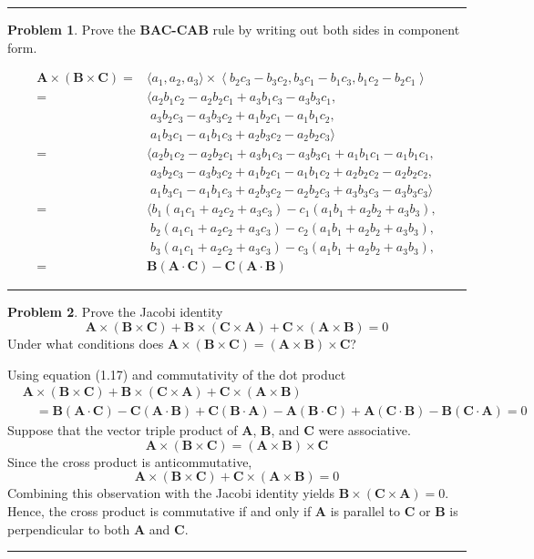 \documentclass{article}
\theoremstyle{definition}
\newtheorem{problem}{Problem}[section]
\theoremstyle{remark}
\newcommand{\pline}{\par\noindent\rule{\textwidth}{0.5pt}}
\newcommand{\components}[1]{\left\langle #1 \right\rangle}
\renewcommand{\vec}{\mathbf}
\newcommand{\veca}{\vec{A}}
\newcommand{\vecb}{\vec{B}}
\newcommand{\vecc}{\vec{C}}
\newcommand{\cross}{\times}
\begin{document}
\pline
\begin{problem}
Prove the \textbf{BAC-CAB} rule by writing out both sides in component form.
\end{problem}
\begin{align*}
\veca\cross(\vecb\cross\vecc) = &\langle a_1,a_2,a_3 \rangle\cross\components{b_2c_3-b_3c_2,b_3c_1-b_1c_3,b_1c_2-b_2c_1} \\
= &\langle a_2b_1c_2-a_2b_2c_1+a_3b_1c_3-a_3b_3c_1, \\
&\; a_3b_2c_3-a_3b_3c_2+a_1b_2c_1-a_1b_1c_2, \\
&\; a_1b_3c_1-a_1b_1c_3+a_2b_3c_2-a_2b_2c_3\rangle \\
= &\langle a_2b_1c_2-a_2b_2c_1+a_3b_1c_3-a_3b_3c_1+a_1b_1c_1-a_1b_1c_1, \\
&\; a_3b_2c_3-a_3b_3c_2+a_1b_2c_1-a_1b_1c_2+a_2b_2c_2-a_2b_2c_2,\\
&\; a_1b_3c_1-a_1b_1c_3+a_2b_3c_2-a_2b_2c_3+a_3b_3c_3-a_3b_3c_3\rangle \\
= &\langle b_1(a_1c_1+a_2c_2+a_3c_3) -c_1(a_1b_1+a_2b_2+a_3b_3), \\
&\; b_2(a_1c_1+a_2c_2+a_3c_3) -c_2(a_1b_1+a_2b_2+a_3b_3), \\
&\; b_3(a_1c_1+a_2c_2+a_3c_3) -c_3(a_1b_1+a_2b_2+a_3b_3), \\
= & \vecb(\veca\cdot\vecc)-\vecc(\veca\cdot\vecb)
\end{align*}
\pline
\begin{problem}
Prove the Jacobi identity
\[\veca\cross(\vecb\cross\vecc) + \vecb\cross(\vecc\cross\veca) + \vecc\cross(\veca\cross\vecb) = 0\]
Under what conditions does $\veca\cross(\vecb\cross\vecc) = (\veca\cross\vecb)\cross\vecc$?
\end{problem}
Using equation (1.17) and commutativity of the dot product
\begin{align*}
&\veca\cross(\vecb\cross\vecc)+\vecb\cross(\vecc\cross\veca)+\vecc\cross(\veca\cross\vecb) \\
&\quad=\vecb(\veca\cdot\vecc)-\vecc(\veca\cdot\vecb) + \vecc(\vecb\cdot\veca)-\veca(\vecb\cdot\vecc) + \veca(\vecc\cdot\vecb)-\vecb(\vecc\cdot\veca) = 0
\end{align*}
Suppose that the vector triple product of $\veca$, $\vecb$, and $\vecc$ were associative. \[\veca\cross(\vecb\cross\vecc) = (\veca\cross\vecb)\cross\vecc\] Since the cross product is anticommutative, \[\veca\cross(\vecb\cross\vecc)+\vecc\cross(\veca\cross\vecb) = 0\] Combining this observation with the Jacobi identity yields $\vecb\cross(\vecc\cross\veca) = 0$. Hence, the cross product is commutative if and only if $\veca$ is parallel to $\vecc$ or $\vecb$ is perpendicular to both $\veca$ and $\vecc$.
\pline
\end{document}

